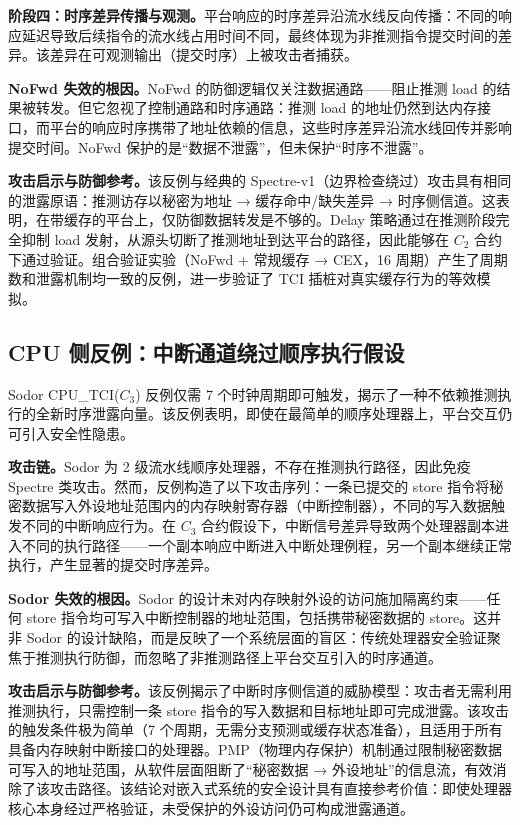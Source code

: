 \textbf{阶段四：时序差异传播与观测。}平台响应的时序差异沿流水线反向传播：不同的响应延迟导致后续指令的流水线占用时间不同，最终体现为非推测指令提交时间的差异。该差异在可观测输出（提交时序）上被攻击者捕获。

\textbf{NoFwd 失效的根因。}NoFwd 的防御逻辑仅关注数据通路——阻止推测 load 的结果被转发。但它忽视了控制通路和时序通路：推测 load 的地址仍然到达内存接口，而平台的响应时序携带了地址依赖的信息，这些时序差异沿流水线回传并影响提交时间。NoFwd 保护的是``数据不泄露''，但未保护``时序不泄露''。

\textbf{攻击启示与防御参考。}该反例与经典的 Spectre-v1（边界检查绕过）攻击具有相同的泄露原语：推测访存以秘密为地址 → 缓存命中/缺失差异 → 时序侧信道。这表明，在带缓存的平台上，仅防御数据转发是不够的。Delay 策略通过在推测阶段完全抑制 load 发射，从源头切断了推测地址到达平台的路径，因此能够在 $C_2$ 合约下通过验证。组合验证实验（NoFwd + 常规缓存 → CEX，16 周期）产生了周期数和泄露机制均一致的反例，进一步验证了 TCI 插桩对真实缓存行为的等效模拟。

\subsection{CPU 侧反例：中断通道绕过顺序执行假设}
\label{subsec:ch4_cex_sodor}

Sodor CPU\_TCI($C_3$) 反例仅需 7 个时钟周期即可触发，揭示了一种不依赖推测执行的全新时序泄露向量。该反例表明，即使在最简单的顺序处理器上，平台交互仍可引入安全性隐患。

\textbf{攻击链。}Sodor 为 2 级流水线顺序处理器，不存在推测执行路径，因此免疫 Spectre 类攻击。然而，反例构造了以下攻击序列：一条已提交的 store 指令将秘密数据写入外设地址范围内的内存映射寄存器（中断控制器），不同的写入数据触发不同的中断响应行为。在 $C_3$ 合约假设下，中断信号差异导致两个处理器副本进入不同的执行路径——一个副本响应中断进入中断处理例程，另一个副本继续正常执行，产生显著的提交时序差异。

\textbf{Sodor 失效的根因。}Sodor 的设计未对内存映射外设的访问施加隔离约束——任何 store 指令均可写入中断控制器的地址范围，包括携带秘密数据的 store。这并非 Sodor 的设计缺陷，而是反映了一个系统层面的盲区：传统处理器安全验证聚焦于推测执行防御，而忽略了非推测路径上平台交互引入的时序通道。

\textbf{攻击启示与防御参考。}该反例揭示了中断时序侧信道的威胁模型：攻击者无需利用推测执行，只需控制一条 store 指令的写入数据和目标地址即可完成泄露。该攻击的触发条件极为简单（7 个周期，无需分支预测或缓存状态准备），且适用于所有具备内存映射中断接口的处理器。PMP（物理内存保护）机制通过限制秘密数据可写入的地址范围，从软件层面阻断了``秘密数据 → 外设地址''的信息流，有效消除了该攻击路径。该结论对嵌入式系统的安全设计具有直接参考价值：即使处理器核心本身经过严格验证，未受保护的外设访问仍可构成泄露通道。

